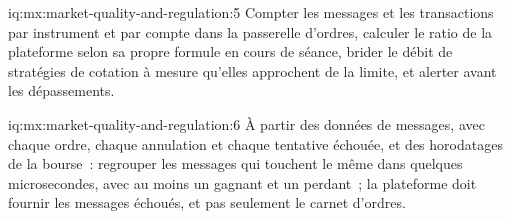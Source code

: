 \begin{solution}{iq:mx:market-quality-and-regulation:5}
Compter les messages et les transactions par instrument et par compte dans la passerelle d'ordres, calculer le ratio de la plateforme selon sa propre formule en cours de séance, brider le débit de
stratégies de cotation à mesure qu'elles approchent de la limite, et alerter avant les dépassements.
\end{solution}

\begin{solution}{iq:mx:market-quality-and-regulation:6}
À partir des données de messages, avec chaque ordre, chaque annulation et chaque tentative échouée, et des horodatages de la bourse~: regrouper les messages qui touchent le même  dans
quelques microsecondes, avec au moins un gagnant et un perdant~; la plateforme doit fournir les messages échoués, et pas seulement le carnet d'ordres.
\end{solution}
